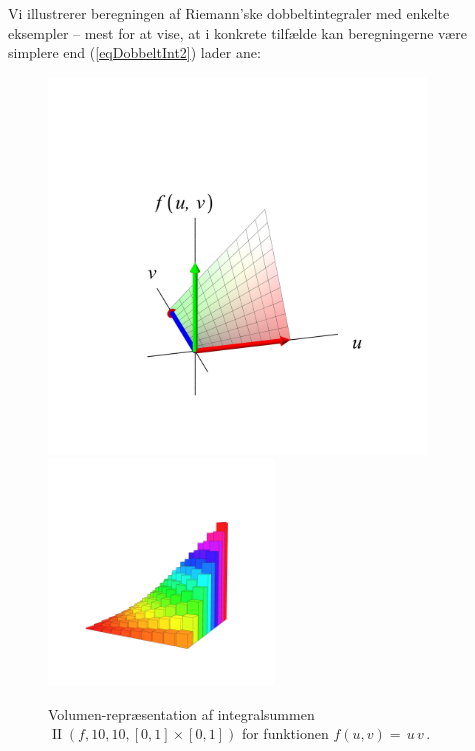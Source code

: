 Vi illustrerer beregningen af Riemann'ske dobbeltintegraler med  enkelte eksempler -- mest for at vise, at
i konkrete tilfælde kan beregningerne være simplere end (\ref{eqDobbeltInt2}) lader ane:




\begin{figure}[h]
\centerline{\includegraphics[height=100mm]{FIGS/plotIntuv} \quad\includegraphics[height=60mm]{FIGS/plotIntuvBox}}
\begin{center}
\caption{\small{Volumen-repræsentation af
integralsummen $\operatorname{II}(f,10, 10, [0,1] \times
[0,1])$  for funktionen $f(u,v) = \,u\,v\,$.}}
\label{FigIIS}
\end{center}
\end{figure}


